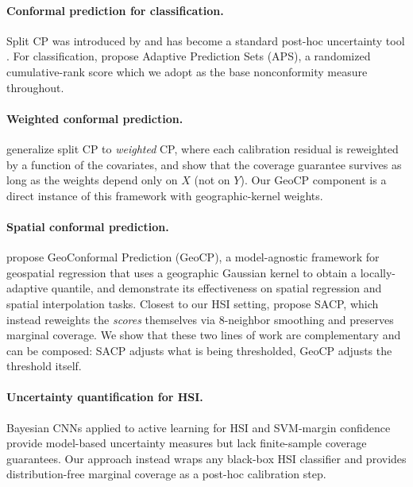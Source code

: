 \documentclass[11pt]{article}
\newcommand{\1}{\mathbf{1}}
\begin{document}
\paragraph{Conformal prediction for classification.} Split CP was introduced by \citet{vovk2005algorithmic} and has become a standard post-hoc uncertainty tool \citep{lei2018distribution,angelopoulos2021gentle}. For classification, \citet{romano2020classification} propose Adaptive Prediction Sets (APS), a randomized cumulative-rank score which we adopt as the base nonconformity measure throughout.

\paragraph{Weighted conformal prediction.} \citet{tibshirani2019conformal} generalize split CP to \emph{weighted} CP, where each calibration residual is reweighted by a function of the covariates, and show that the coverage guarantee survives as long as the weights depend only on $X$ (not on $Y$).  Our GeoCP component is a direct instance of this framework with geographic-kernel weights.

\paragraph{Spatial conformal prediction.} \citet{lou2024geoconformal} propose GeoConformal Prediction (GeoCP), a model-agnostic framework for geospatial regression that uses a geographic Gaussian kernel to obtain a locally-adaptive quantile, and demonstrate its effectiveness on spatial regression and spatial interpolation tasks. Closest to our HSI setting, \citet{liu2024sacp} propose SACP, which instead reweights the \emph{scores} themselves via 8-neighbor smoothing and preserves marginal coverage. We show that these two lines of work are complementary and can be composed: SACP adjusts what is being thresholded, GeoCP adjusts the threshold itself.

\paragraph{Uncertainty quantification for HSI.} Bayesian CNNs applied to active learning for HSI \citep{haut2018bayesian} and SVM-margin confidence \citep{melgani2004svm} provide model-based uncertainty measures but lack finite-sample coverage guarantees. Our approach instead wraps any black-box HSI classifier and provides distribution-free marginal coverage as a post-hoc calibration step.
\end{document}
